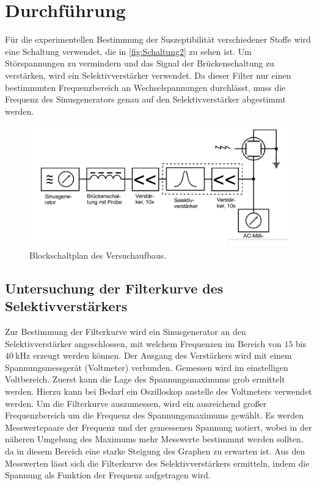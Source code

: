 \section{Durchführung}
\label{sec:Durchführung}
Für die experimentellen Bestimmung der Suszeptibilität verschiedener Stoffe wird eine Schaltung verwendet, die in \autoref{fig:Schaltung2} zu sehen ist.
Um Störspannungen zu vermindern und das Signal der Brückenschaltung zu verstärken, wird ein Selektivverstärker verwendet. Da dieser Filter nur einen 
bestimmmten Frequenzbereich an Wechselspannungen durchlässt, muss die Frequenz des Sinusgenerators genau auf den Selektivverstärker abgestimmt werden.

\begin{figure}
    \centering
    \includegraphics[width = .8\textwidth]{content/Schaltung2.png}
    \caption{Blockschaltplan des Versuchaufbaus. \cite{v606}}
    \label{fig:Schaltung2}
\end{figure}

\subsection{Untersuchung der Filterkurve des Selektivverstärkers}
\label{subsec:D_Filterkurve}
Zur Bestimmung der Filterkurve wird ein Sinusgenerator an den Selektivverstärker angeschlossen, mit welchem Frequenzen im Bereich von $15$ bis $\qty{40}{\kilo\hertz}$
erzeugt werden können. Der Ausgang des Verstärkers wird mit einem Spannungsmessgerät (Voltmeter) verbunden. Gemessen wird im einstelligen Voltbereich.
Zuerst kann die Lage des Spannungsmaximums grob ermittelt werden. Hierzu kann bei Bedarf ein Oszilloskop anstelle des Voltmeters verwendet werden.
Um die Filterkurve auszumessen, wird ein ausreichend großer Frequenzbereich um die Frequenz des Spannungsmaximums gewählt. Es werden Messwertepaare der Frequenz
und der gemessenen Spannung notiert, wobei in der näheren Umgebung des Maximums mehr Messwerte bestimmmt werden sollten, da in diesem Bereich eine starke Steigung 
des Graphen zu erwarten ist.
Aus den Messwerten lässt sich die Filterkurve des Selektivverstärkers ermitteln, indem die Spannung als Funktion der Frequenz aufgetragen wird.

